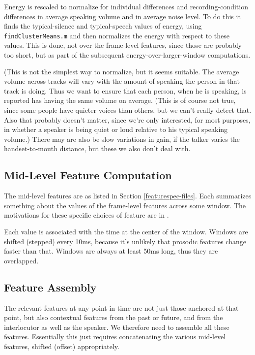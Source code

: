 \documentclass[11pt]{article}
\begin{document}
Energy is rescaled to normalize for individual differences and
recording-condition differences in average speaking volume and in
average noise level.  To do this it finds the typical-silence and
typical-speech values of energy, using {\tt findClusterMeans.m} and
then normalizes the energy with respect to these values.  This is
done, not over the frame-level features, since those are probably too
short, but as part of the subsequent energy-over-larger-window
computations.

(This is not the simplest way to normalize, but it seems suitable.
The average volume across tracks will vary with the amount of speaking
the person in that track is doing.  Thus we want to ensure that each
person, when he is speaking, is reported has having the same volume on
average.  (This is of course not true, since some people have quieter
voices than others, but we can't really detect that.  Also that
probably doesn't matter, since we're only interested, for most
purposes, in whether a speaker is being quiet or loud relative to his
typical speaking volume.)  There may are also be slow variations in
gain, if the talker varies the handset-to-mouth distance, but these we
also don't deal with.


\subsection{Mid-Level Feature Computation}   \label{other-features}

The mid-level features are as listed in Section
\ref{featurespec-files}.  Each summarizes something about the values
of the frame-level features across some window.  The motivations for
these specific choices of feature are in \cite{mid-level-features}.

Each value is associated with the time at the center of the window.
Windows are shifted (stepped) every 10ms, because it's unlikely that
prosodic features change faster than that.  Windows are always at
least 50ms long, thus they are overlapped.


\subsection{Feature Assembly}

The relevant features at any point in time are not just those anchored
at that point, but also contextual features from the past or future,
and from the interlocutor as well as the speaker.  We therefore need
to assemble all these features.  
Essentially this just requires concatenating the various mid-level
features, shifted (offset) appropriately.
\end{document}
